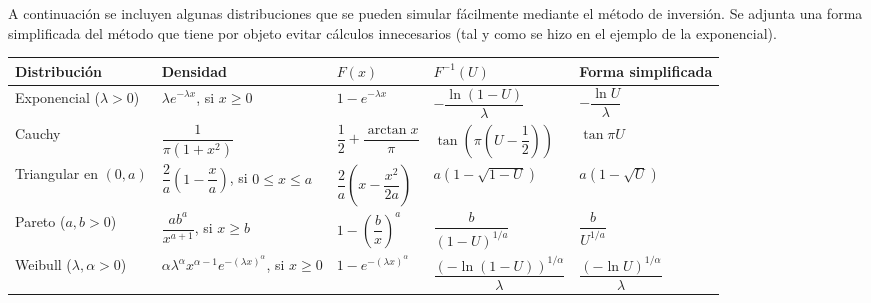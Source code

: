 \documentclass[
  spanish,
  10pt,
]{book}
\newcounter{none} %
\theoremstyle{break}
\theoremstyle{nonumberplain}
\begin{document}
A continuación se incluyen algunas distribuciones que se pueden simular fácilmente mediante el método de inversión.
Se adjunta una forma simplificada del método que tiene por objeto evitar cálculos innecesarios (tal y como se hizo en el ejemplo de la exponencial).

{\def\LTcaptype{none} %
\begin{longtable}[]{@{}
  >{\raggedright\arraybackslash}p{}
  >{\centering\arraybackslash}p{}
  >{\centering\arraybackslash}p{}
  >{\centering\arraybackslash}p{}
  >{\centering\arraybackslash}p{}@{}}
\toprule\noalign{}
\begin{minipage}[b]{\linewidth}\raggedright
Distribución
\end{minipage} & \begin{minipage}[b]{\linewidth}\centering
Densidad
\end{minipage} & \begin{minipage}[b]{\linewidth}\centering
\(F(x)\)
\end{minipage} & \begin{minipage}[b]{\linewidth}\centering
\(F^{-1}\left( U\right)\)
\end{minipage} & \begin{minipage}[b]{\linewidth}\centering
Forma simplificada
\end{minipage} \\
\midrule\noalign{}
\endhead
\bottomrule\noalign{}
\endlastfoot
Exponencial (\(\lambda>0\)) & \(\lambda e^{-\lambda x}\), si \(x\geq0\) & \(1-e^{-\lambda x}\) & \(-\dfrac{\ln\left( 1-U\right)  }\lambda\) & \(-\dfrac{\ln U}\lambda\) \\
Cauchy & \(\dfrac1{\pi\left( 1+x^{2}\right)}\) & \(\dfrac12+\dfrac{\arctan x}\pi\) & \(\tan\left( \pi\left( U-\dfrac12\right) \right)\) & \(\tan\pi U\) \\
Triangular en \(\left( 0,a\right)\) & \(\dfrac2a\left( 1-\dfrac xa\right)\), si \(0\leq x\leq a\) & \(\dfrac2a\left(x-\dfrac{x^{2}}{2a}\right)\) & \(a\left( 1-\sqrt{1-U}\right)\) & \(a\left( 1-\sqrt{U}\right)\) \\
Pareto (\(a,b>0\)) & \(\dfrac{ab^{a}}{x^{a+1}}\), si \(x\geq b\) & \(1-\left( \dfrac bx\right)^{a}\) & \(\dfrac b{\left( 1-U\right)^{1/a}}\) & \(\dfrac b{U^{1/a}}\) \\
Weibull (\(\lambda,\alpha>0\)) & \(\alpha\lambda^{\alpha}x^{\alpha-1}e^{-\left( \lambda x\right)  ^{\alpha}}\), si \(x\geq0\) & \(1-e^{-\left( \lambda x\right)^{\alpha}}\) & \(\dfrac{\left( -\ln\left(1-U\right)  \right)^{1/\alpha}}\lambda\) & \(\dfrac{\left( -\ln U\right)^{1/\alpha}}\lambda\) \\
\end{longtable}
}
\end{document}
